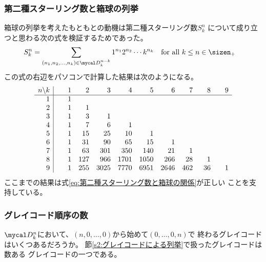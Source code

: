 \subsubsection{第二種スターリング数と箱球の列挙}
\label{s2:第二種スターリング数と箱球の列挙} %
	箱球の列挙を考えたもともとの動機は第二種スターリング数$S_k^n$
	について成り立つと思わる次の式を検証するためであった。
	\begin{equation}\label{eq:第二種スターリング数と箱球の関係}
	\begin{split} %
		S_k^n &= \sum_{(n_1,n_2,\dots,n_k)\in\hakodama_k^{n-k}}
			1^{n_1}2^{n_2}\cdots k^{n_k}
			\quad\text{for all }k\le n\in\sizen_+
	\end{split}\end{equation} %
	この式の右辺をパソコンで計算した結果は次のようになる。
	\begin{equation*}\begin{array}{r|@{\quad}rrrrrrrrrr} %
		n\backslash k & \hspace{1em}1 & \hspace{1em}2 & \hspace{1em}3 & \hspace{1em}4 & \hspace{1em}5 & \hspace{1em}6 & \hspace{1em}7 & \hspace{1em}8 & \hspace{1em}9 \\ \hline
		1 & 1 \\
		2 & 1 & 1 \\
		3 & 1 & 3 & 1 \\
		4 & 1 & 7 & 6 & 1 \\
		5 & 1 & 15 & 25 & 10 & 1 \\
		6 & 1 & 31 & 90 & 65 & 15 & 1 \\
		7 & 1 & 63 & 301 & 350 & 140 & 21 & 1 \\
		8 & 1 & 127 & 966 & 1701 & 1050 & 266 & 28 & 1 \\
		9 & 1 & 255 & 3025 & 7770 & 6951 & 2646 & 462 & 36 & 1 \\
	\end{array}\end{equation*} %
	ここまでの結果は式\eqref{eq:第二種スターリング数と箱球の関係}が正しい
	ことを支持している。
\subsubsection{グレイコード順序の数}\label{s2:グレイコード順序の数} %
	$\hakodama_k^n$において、$(n,0,\dots,0)$から始めて$(0,\dots,0,n)$で
	終わるグレイコードはいくつあるだろうか。
	節\ref{s2:グレイコードによる列挙}で扱ったグレイコードは数ある
	グレイコードの一つである。
%
